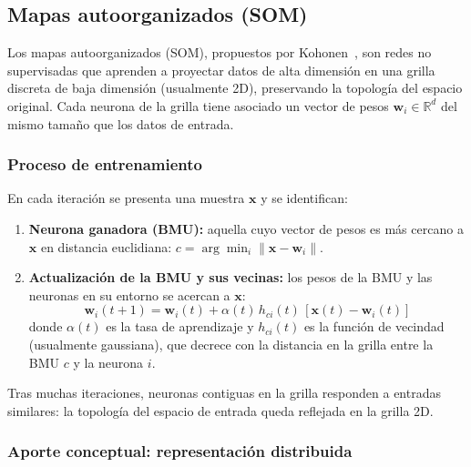 \subsection{Mapas autoorganizados (SOM)}
\label{subsec:som}

Los mapas autoorganizados (SOM), propuestos por Kohonen~\cite{kohonen1990som},
son redes no supervisadas que aprenden a proyectar datos de alta dimensión en
una grilla discreta de baja dimensión (usualmente 2D), preservando la topología
del espacio original. Cada neurona de la grilla tiene asociado un vector de
pesos $\bm{w}_i \in \mathbb{R}^d$ del mismo tamaño que los datos de entrada.

\subsubsection*{Proceso de entrenamiento}

En cada iteración se presenta una muestra $\bm{x}$ y se identifican:

\begin{enumerate}
    \item \textbf{Neurona ganadora (BMU):} aquella cuyo vector de pesos es más
    cercano a $\bm{x}$ en distancia euclidiana:
    $c = \arg\min_i \|\bm{x} - \bm{w}_i\|$.

    \item \textbf{Actualización de la BMU y sus vecinas:} los pesos de la BMU
    y las neuronas en su entorno se acercan a $\bm{x}$:
    \begin{equation}
        \bm{w}_i(t{+}1) = \bm{w}_i(t) + \alpha(t)\,h_{ci}(t)\,
        [\bm{x}(t) - \bm{w}_i(t)]
    \end{equation}
    donde $\alpha(t)$ es la tasa de aprendizaje y $h_{ci}(t)$ es la función
    de vecindad (usualmente gaussiana), que decrece con la distancia en la
    grilla entre la BMU $c$ y la neurona $i$.
\end{enumerate}

Tras muchas iteraciones, neuronas contiguas en la grilla responden a entradas
similares: la topología del espacio de entrada queda reflejada en la grilla 2D.





\subsubsection*{Aporte conceptual: representación distribuida}


